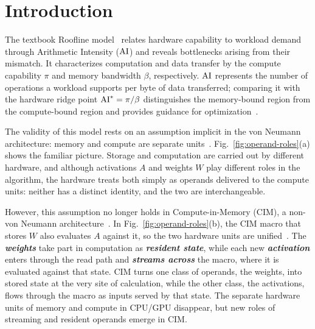 \section{Introduction}
\label{sec:introduction}
The textbook Roofline model~\cite{williams2009roofline} relates hardware capability to workload demand through Arithmetic Intensity ($\mathrm{AI}$) and reveals bottlenecks arising from their mismatch. It characterizes computation and data transfer by the compute capability $\pi$ and memory bandwidth $\beta$, respectively. $\mathrm{AI}$ represents the number of operations a workload supports per byte of data transferred; comparing it with the hardware ridge point $\mathrm{AI}^*=\pi/\beta$ distinguishes the memory-bound region from the compute-bound region and provides guidance for optimization~\cite{verhelst2025roofline,gerogiannis2025deca}.

The validity of this model rests on an assumption implicit in the von Neumann architecture: memory and compute are separate units~\cite{rheindt2020xcentric}. Fig.~\ref{fig:operand-roles}(a) shows the familiar picture. Storage and computation are carried out by different hardware, and although activations $A$ and weights $W$ play different roles in the algorithm, the hardware treats both simply as operands delivered to the compute units: neither has a distinct identity, and the two are interchangeable.

However, this assumption no longer holds in Compute-in-Memory (CIM), a non-von Neumann architecture~\cite{sun2023fullspectrumcomputinginmemory}. In Fig.~\ref{fig:operand-roles}(b), the CIM macro that stores $W$ also evaluates $A$ against it, so the two hardware units are unified~\cite{verma2019imc}. The \textbf{\emph{weights}} take part in computation as \textbf{\emph{resident state}}, while each new \textbf{\emph{activation}} enters through the read path and \textbf{\emph{streams across}} the macro, where it is evaluated against that state. CIM turns one class of operands, the weights, into stored state at the very site of calculation, while the other class, the activations, flows through the macro as inputs served by that state. The separate hardware units of memory and compute in CPU/GPU disappear, but new roles of streaming and resident operands emerge in CIM.

